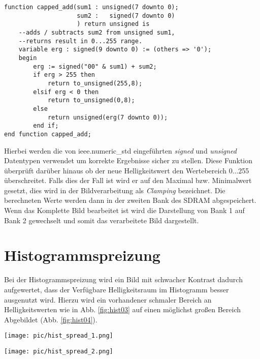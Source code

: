 \documentclass[%
  paper=A4, %
  pagesize, %
  12pt,
  ngerman   %
]{scrreprt}  %
\begin{document}
\lstset{numbers = left,
numberstyle =\tiny,
language = VHDL, 
tabsize = 4,
keywordstyle=\color{blue},          %
commentstyle=\color{dkgreen},       %
basicstyle= \footnotesize\ttfamily
}
\begin{lstlisting}
function capped_add(sum1 : unsigned(7 downto 0);
 					sum2 :   signed(7 downto 0)
 					) return unsigned is
	--adds / subtracts sum2 from unsigned sum1,
	--returns result in 0...255 range.
	variable erg : signed(9 downto 0) := (others => '0');
	begin
		erg := signed("00" & sum1) + sum2;
		if erg > 255 then
			return to_unsigned(255,8);
		elsif erg < 0 then
			return to_unsigned(0,8);
		else
			return unsigned(erg(7 downto 0));
		end if;
end function capped_add;
\end{lstlisting}

Hierbei werden die von ieee.numeric\_std eingeführten \emph{signed} und \emph{unsigned} Datentypen verwendet um korrekte Ergebnisse sicher zu stellen. Diese Funktion überprüft darüber hinaus ob der neue Helligkeitswert den Wertebereich 0...255 überschreitet. Falls dies der Fall ist wird er auf den Maximal bzw. Minimalwert gesetzt, dies wird in der Bildverarbeitung als \emph{Clamping} bezeichnet. Die berechneten Werte werden dann in der zweiten Bank des SDRAM abgespeichert. Wenn das Komplette Bild bearbeitet ist wird die Darstellung von Bank 1 auf Bank 2 gewechselt und somit das verarbeitete Bild dargestellt.

\section{Histogrammspreizung}
\label{sec:hist_spread}
Bei der Histogrammspreizung wird ein Bild mit schwacher Kontrast dadurch aufgewertet, dass der Verfügbare Helligkeitsraum im Histogramm besser ausgenutzt wird. Hierzu wird ein vorhandener schmaler Bereich an Helligkeitswerten wie in Abb. \ref{fig:hist03} auf einen möglichst großen Bereich Abgebildet (Abb. \ref{fig:hist04}).

\noindent\begin{minipage}{.45\textwidth}
  \centering
  \texttt{[image: pic/hist\_spread\_1.png]}
  \label{fig:hist03}         
\end{minipage}
\begin{minipage}{.45\textwidth}
  \centering
  \texttt{[image: pic/hist\_spread\_2.png]}
  \label{fig:hist04}            
\end{minipage}
\end{document}
